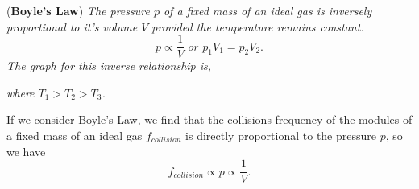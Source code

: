 \begin{theorem}{(\textbf{Boyle's Law})}
\textit{The pressure $p$ of a fixed mass of an ideal gas is inversely proportional to it's volume $V$ provided the temperature remains constant.}
\begin{equation}
    p \propto \frac{1}{V} \textit{ or } p_1 V_1 = p_2 V_2.
\end{equation}
\textit{The graph for this inverse relationship is,}
\begin{figure}[h!]
    \centering
\end{figure}
\FloatBarrier
\noindent \textit{where $T_1 > T_2 > T_3$.}
\end{theorem}

If we consider Boyle's Law, we find that the collisions frequency of the modules of a fixed mass of an ideal gas $f_{collision}$ is directly proportional to the pressure $p$, so we have
\begin{equation}
    f_{collision} \propto p \propto \frac{1}{V}.
\end{equation}

